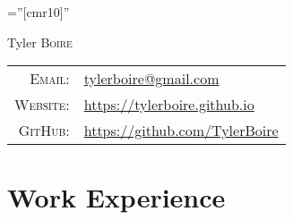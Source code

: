 \documentclass[a4paper,10pt]{article}
\begin{document}
\pagestyle{empty} 		%

\font\fb=''[cmr10]'' 	%

{\Huge Tyler \textsc{Boire}}


\begin{tabular}{rl}
    \textsc{Email:}   & \href{mailto:tylerboire@gmail.com}{tylerboire@gmail.com}\\
    \textsc{Website:} & \href{https://tylerboire.github.io}{https://tylerboire.github.io}\\
    \textsc{GitHub:}  & \href{https://github.com/TylerBoire}{https://github.com/TylerBoire}
\end{tabular}

\section{Work Experience}
\end{document}
